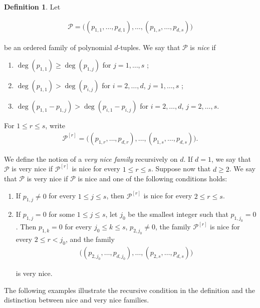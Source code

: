 \documentclass[11pt,reqno]{amsart}
\newcommand{\cP}{{\mathcal P}}
\theoremstyle{definition}
\newtheorem{definition}[definition]{Definition}
\theoremstyle{remark}
\begin{document}
\begin{definition}

Let 

\begin{align*}
    \cP=
\big(
(p_{1,1},\ldots,p_{d,1}),
\ldots,
(p_{1,s},\ldots,p_{d,s})
\big)
\end{align*}

be an ordered family of polynomial $d$-tuples. We say that $\cP$ is {\em nice} if
\begin{enumerate}
\item
$\deg(p_{1,1})\geq \deg(p_{1,j})$ for $j=1,\ldots,s$ ;
\medskip
\item
$\deg(p_{1,1})>\deg(p_{i,j})$ for $i=2,\ldots,d$, $j=1,\ldots,s$ ;
\medskip
\item
$\deg(p_{1,1}-p_{1,j})>\deg(p_{i,1}-p_{i,j})$ for $i=2,\ldots,d$,
$j=2,\ldots,s$.
\end{enumerate} 

 For $1\leq r\leq s$, write \begin{align*}
    \cP^{[r]}=\big((p_{1,r},\ldots,p_{d,r}),\ldots,(p_{1,s},\ldots,p_{d,s})\big).
\end{align*}

We define the notion of a {\em very nice family} recursively on $d$. If $d=1$, we say that $\cP$ is very nice if $\cP^{[r]}$ is nice for every $1\leq r\leq s$. Suppose now that $d\geq2$. We say that $\cP$ is very nice if $\cP$ is nice and one of the following conditions holds:\begin{enumerate}
    \item If $p_{1,j}\neq0$ for every $1\leq j\leq s$, then $\cP^{[r]}$ is nice for every $2\leq r\leq s$.
    \item If $p_{1,j}=0$ for some $1\leq j\leq s$, let $j_0$ be the smallest integer such that $p_{1,j_0}=0$. Then $p_{1,k}=0$ for every $j_0\leq k\leq s$, $p_{2,j_0}\neq 0$, the family $\mathcal P^{[r]}$ is nice for every $2\leq r<j_0$, and the family
\begin{align*}
    \big(
(p_{2,j_0},\ldots,p_{d,j_0}),
\ldots,
(p_{2,s},\ldots,p_{d,s})
\big)
\end{align*}

is very nice.
\end{enumerate}

\end{definition}

The following examples illustrate the recursive condition in the definition and the distinction between nice and very nice families.
\end{document}
